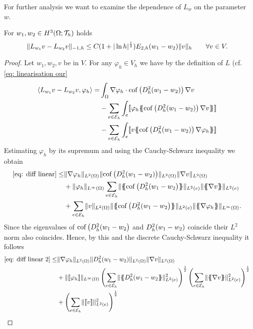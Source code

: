 For further analysis we want to examine the dependence of $L_w$ on the parameter $w$.
\begin{lemma}\label{la: L dependence paramter}
	For $w_1, w_2 \in H^3(\Omega; \mathcal{T}_h)$ holds
	\[
		\lVert L_{w_1} v - L_{w_2} v \rVert_{-1,h} \leq C (1+|\ln h|^{\frac 1 2})E_{2,h}(w_1 - w_2) \lVert v \rVert_{h} \qquad \forall v \in V. 
	\]
\end{lemma}
\begin{proof}
	Let $w_1, w_2, v$ be in $V$. For any $\varphi_h \in V_h$ we have by the definition of $L$ (cf. \eqref{eq: linearisation our}
	\begin{align}
		\bilin{L_{w_1}v- L_{w_2} v} {\varphi_h} =  
			&\int_{\Omega} \nabla \varphi_h \cdot \cofHessH{(w_1-w_2)} \nabla v  \nonumber\\
			& -\sum\limits_{e \in \edges}\int_{e} \jump {\varphi_h \average { \cofHessH{(w_1-w_2)} \nabla v} } \nonumber \\
			& - \sum\limits_{e \in \edges}\int_{e} \jump {v \average{ \cofHessH{(w_1-w_2)} \nabla \varphi_h} } \label{eq: diff linear}
	\end{align}
	Estimating $\varphi_h$ by its supremum and using the Cauchy-Schwarz inequality we obtain
	\begin{align}
		\eqref{eq: diff linear}
		\leq& \LTwonorm{\nabla \varphi_h} \LTwonorm{\cofHessH{(w_1 -w_2)}} \LTwonorm {\nabla v} \nonumber \\
			&+ \LInftynorm{\varphi_h} \sum_{e \in \edges} \LTwonormE{\average{\cofHessH{(w_1-w_2}}} \LTwonormE{\average{\nabla v}} \nonumber \\
			&+ \sum_{e \in \edges} \LTwonorm{v} \LTwonormE{\average{\cofHessH{(w_1-w_2}}} \LInftynorm{\average{\nabla \varphi_h}}.\label{eq: diff linear 2}
	\end{align}
	Since the eigenvalues of $\operatorname{cof} \left( D_h^2 (w_1-w_2 \right)$ and $D_h^2 (w_1-w_2)$ coincide their $L^2$ norm also coincides. Hence, by this and the discrete Cauchy-Schwarz inequality it follows
	\begin{align}
		\eqref{eq: diff linear 2} %
		\leq& \LTwonorm{\nabla \varphi_h} \LTwonorm{\hess{(w_1 -w_2)}} \LTwonorm {\nabla v} \nonumber \\
			&+ \LInftynorm{\jump {\varphi_h}} 
				\left(\sum_{e \in \edges} \LTwonormE{\average{\hess{(w_1-w_2}}}^2 \right)^{\frac 1 2} 
				\left(\sum_{e \in \edges} \LTwonormE{\average{\nabla v}}^2 \right)^{\frac 1 2} \nonumber \\
			&+ 	\left(\sum_{e \in \edges} \LTwonormE{\jump v}^2 \right)^{\frac 1 2} 

\end{align}
\end{proof}
